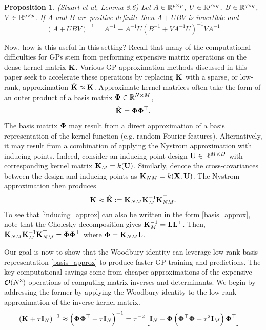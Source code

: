 \documentclass[12pt]{article}
\newtheorem{prop}{Proposition}
\begin{document}
\begin{prop} (Stuart et al, Lemma 8.6) \label{Woodbury}
Let $A \in \R^{p \times p}$, $U \in \R^{p \times q}$, $B \in \R^{q \times q}$, $V \in \R^{q \times p}$. If $A$ and $B$ are positive definite then $A + UBV$ is invertible 
and 
\[(A + UBV)^{-1} = A^{-1} - A^{-1} U\left(B^{-1} + VA^{-1}U\right)^{-1}VA^{-1}\]
\end{prop}
Now, how is this useful in this setting? Recall that many of the computational difficulties for GPs stem from performing expensive matrix operations on the dense 
kernel matrix $\kerMat$. Various GP approximation methods discussed in this paper seek to accelerate these operations by replacing $\kerMat$
with a sparse, or low-rank, approximation $\kerMatApprox \approx \kerMat$. Approximate kernel matrices often take the form of an outer product of a basis matrix 
$\kerBasisMat \in \R^{\Ndesign \times \NpseudoData}$,
\begin{align}
\kerMatApprox = \kerBasisMat \kerBasisMat^\top. \label{basis_approx}
\end{align}
The basis matrix $\kerBasisMat$ may result from a direct approximation of a basis representation of the kernel function (e.g. random Fourier features). Alternatively, it may result 
from a combination of applying the Nystrom approximation with inducing points. Indeed, consider an inducing point design $\designMatInducing \in \R^{\NpseudoData \times \inputDim}$ 
with corresponding kernel matrix $\kerMatInducing = \GPKer(\designMatInducing)$. Similarly, denote the cross-covariances between the design and inducing points as 
$\crossCovInducing = \GPKer(\designMat, \designMatInducing)$. The Nystrom approximation then produces
\begin{align}
\kerMat \approx \kerMatApprox := \crossCovInducing \kerMatInducing^{-1} \crossCovInducing^\top. \label{inducing_approx}
\end{align}
To see that \ref{inducing_approx} can also be written in the form \ref{basis_approx}, note that the Cholesky decomposition gives $\kerMatInducing^{-1} = \mathbf{L} \mathbf{L}^\top$. Then, 
$ \crossCovInducing \kerMatInducing^{-1} \crossCovInducing^\top = \kerBasisMat \kerBasisMat^\top$ where $\kerBasisMat = \crossCovInducing \mathbf{L}$.

Our goal is now to show that the Woodbury identity can leverage low-rank basis representation \ref{basis_approx} to produce faster GP training and predictions. The key computational savings 
come from cheaper approximations of the expensive $\BigO(\Ndesign^3)$ operations of computing matrix inverses and determinants. We begin by addressing the former by applying the 
Woodbury identity to the low-rank approximation of the inverse kernel matrix. 
\begin{align*}
\left(\kerMat + \nugget \I[\Ndesign] \right)^{-1} &\approx \left(\kerBasisMat \kerBasisMat^\top + \nugget \I[\Ndesign] \right)^{-1} = \nugget^{-2} \left[\I[\Ndesign] - \kerBasisMat \left(\kerBasisMat^\top \kerBasisMat + \nugget^2 \I[\NpseudoData] \right) \kerBasisMat^\top \right] 	\end{align*}
\end{document}
